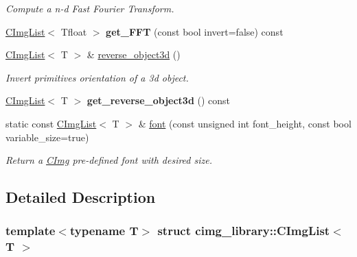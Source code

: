 \begin{DoxyCompactItemize}
\begin{DoxyCompactList}\small\item\em Compute a n-\/d Fast Fourier Transform. \item\end{DoxyCompactList}\item 
\hypertarget{structcimg__library_1_1CImgList_a344967c8b6e7bf0aa40039d1ab29efe2}{
\hyperlink{structcimg__library_1_1CImgList}{CImgList}$<$ Tfloat $>$ {\bfseries get\_\-FFT} (const bool invert=false) const }
\label{structcimg__library_1_1CImgList_a344967c8b6e7bf0aa40039d1ab29efe2}

\item 
\hypertarget{structcimg__library_1_1CImgList_a91693b640cda50a0830fdc1e7c7906e7}{
\hyperlink{structcimg__library_1_1CImgList}{CImgList}$<$ T $>$ \& \hyperlink{structcimg__library_1_1CImgList_a91693b640cda50a0830fdc1e7c7906e7}{reverse\_\-object3d} ()}
\label{structcimg__library_1_1CImgList_a91693b640cda50a0830fdc1e7c7906e7}

\begin{DoxyCompactList}\small\item\em Invert primitives orientation of a 3d object. \item\end{DoxyCompactList}\item 
\hypertarget{structcimg__library_1_1CImgList_a70dfc1cdeccae505ac5c7077f46e39c2}{
\hyperlink{structcimg__library_1_1CImgList}{CImgList}$<$ T $>$ {\bfseries get\_\-reverse\_\-object3d} () const }
\label{structcimg__library_1_1CImgList_a70dfc1cdeccae505ac5c7077f46e39c2}

\item 
static const \hyperlink{structcimg__library_1_1CImgList}{CImgList}$<$ T $>$ \& \hyperlink{structcimg__library_1_1CImgList_a7834cdaab8dc2eccc67a7105a9b1febd}{font} (const unsigned int font\_\-height, const bool variable\_\-size=true)
\begin{DoxyCompactList}\small\item\em Return a \hyperlink{structcimg__library_1_1CImg}{CImg} pre-\/defined font with desired size. \item\end{DoxyCompactList}\end{DoxyCompactItemize}


\subsection{Detailed Description}
\subsubsection*{template$<$typename T$>$ struct cimg\_\-library::CImgList$<$ T $>$}

